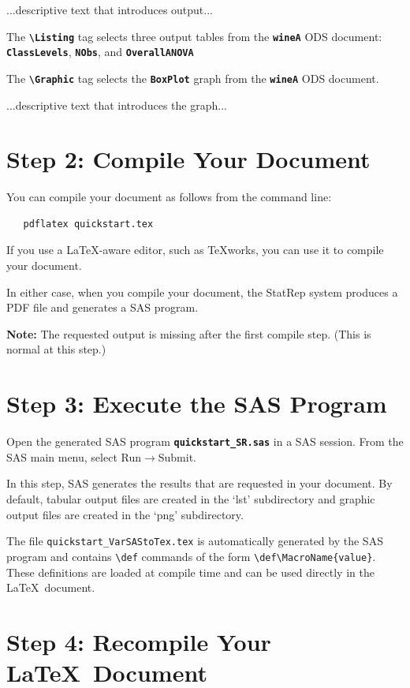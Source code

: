 \documentclass{article}
\newcommand*{\Statrep}{\mbox{\textsf{StatRep}}\xspace}
\newcommand*{\Code}[1]{\texttt{\textbf{#1}}}
\newcommand*{\cs}[1]{\texttt{\textbf{\textbackslash#1}}}
\begin{document}
...descriptive text that introduces output...

The \cs{Listing} tag selects three output tables from the \Code{wineA} ODS document:
\Code{ClassLevels}, \Code{NObs}, and \Code{OverallANOVA}


The \cs{Graphic} tag selects the \Code{BoxPlot}
graph from the \Code{wineA} ODS document.

...descriptive text that introduces the graph...



\section{Step 2: Compile Your Document}

You can compile your document as follows from the command line:
\begin{verbatim}
   pdflatex quickstart.tex
\end{verbatim}

If you use a \LaTeX-aware editor, such as \TeX works, you can use it to
compile your document.

In either case, when you compile your document, the
\Statrep system produces a PDF file and generates a SAS program.

\textbf{Note:} The requested output is missing after the first compile step.
(This is normal at this step.)

\section{Step 3: Execute the SAS Program}

Open the generated SAS program \Code{quickstart\_SR.sas} in a
SAS session. From the SAS main menu, select
\textsf{Run}$\rightarrow$\textsf{Submit}.

In this step, SAS generates the results that are requested in your document.
By default, tabular output files are created in the `lst' subdirectory and
graphic output files are created in the `png' subdirectory.

The file \texttt{quickstart\_VarSAStoTex.tex} is automatically generated 
by the SAS program and contains \verb|\def| commands of the form
\verb|\def\MacroName{value}|. These definitions are loaded at compile time
and can be used directly in the \LaTeX\ document.\section{Step 4: Recompile Your \LaTeX\ Document}
\end{document}
